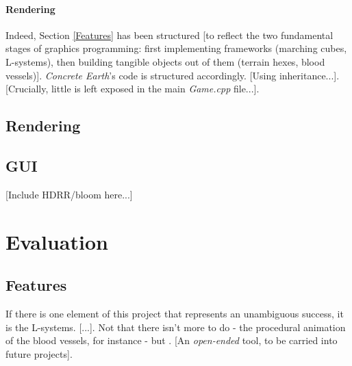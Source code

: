 \documentclass[a4paper, 11pt]{article}
\begin{document}
\begin{flushleft}
\paragraph{Rendering}

\vspace{5pt}\noindent
Indeed, Section \ref{Features} has been structured [to reflect the two fundamental stages of graphics programming: first implementing frameworks (marching cubes, L-systems), then building tangible objects out of them (terrain hexes, blood vessels)]. \textit{Concrete Earth}'s code is structured accordingly. [Using inheritance...]. [Crucially, little is left exposed in the main \textit{Game.cpp} file...].

\vspace{5pt}

\vspace{5pt}


\subsection{Rendering}

\subsection{GUI}

[Include HDRR/bloom here...]

\section{Evaluation}\label{Evaluation}

\subsection{Features}

If there is one element of this project that represents an unambiguous success, it is the L-systems. [...]. Not that there isn't more to do - the procedural animation of the blood vessels, for instance - but . [An \textit{open-ended} tool, to be carried into future projects].


\end{flushleft}
\end{document}

